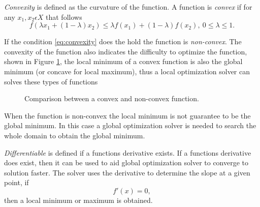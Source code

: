 \textit{Convexity} is defined as the curvature of the function. A function is \textit{convex} if for any $x_1,x_2 \epsilon X$ that follows
\begin{equation}
    \label{eq:convexity}
    f(\lambda x_1 + (1-\lambda)x_2) \leq \lambda f(x_1)+(1-\lambda)f(x_2),\ 0 \leq \lambda \leq 1.
\end{equation}

If the condition \ref{eq:convexity} does the hold the function is \textit{non-convex}. The convexity of the function also indicates the difficulty to optimize the function, shown in Figure \ref{fig:convexity}, the local minimum of a convex function is also the global minimum (or concave for local maximum), thus a local optimization solver can solves these types of functions 

\begin{figure}[!ht]
  
  \begin{subfigure}[t]{0.5\textwidth}
      \caption{}
    \end{subfigure}
    \begin{subfigure}[t]{0.5\textwidth}
      \caption{}
    \end{subfigure}
  \caption{Comparison between a convex and non-convex function.}
  \label{fig:convexity}
\end{figure}


When the function is non-convex the local minimum is not guarantee to be the global minimum. In this case a global optimization solver is needed to search the whole domain to obtain the global minimum. 

\textit{Differentiable} is defined if a functions derivative exists. If a functions derivative does exist, then it can be used to aid global optimization solver to converge to solution faster. The solver uses the derivative to determine the slope at a given point, if 
\begin{equation}
    f'(x) = 0,
\end{equation}
then a local minimum or maximum is obtained.

